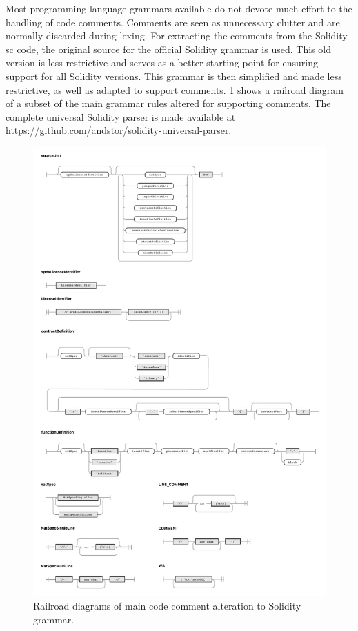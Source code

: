 Most programming language grammars available do not devote much effort to the handling of code comments. Comments are seen as unnecessary clutter and are normally discarded during lexing. For extracting the comments from the Solidity \acrshort{sc} code, the original source \cite{solidity-antlr4} for the official Solidity grammar \cite{soliditygrammar} is used. This old version is less restrictive and serves as a better starting point for ensuring support for all Solidity versions. This grammar is then simplified and made less restrictive, as well as adapted to support comments. \cref{fig:solidity-railroad-diagram} shows a railroad diagram of a subset of the main grammar rules altered for supporting comments. The complete universal Solidity parser is made available at https://github.com/andstor/solidity-universal-parser.

\begin{figure}[htbp]
    \centering
    \includegraphics[width=\textwidth]{figures/solidity-comments-railroad-diagram.pdf}
    \caption{Railroad diagrams of main code comment alteration to Solidity grammar.}
    \label{fig:solidity-railroad-diagram}
\end{figure}


